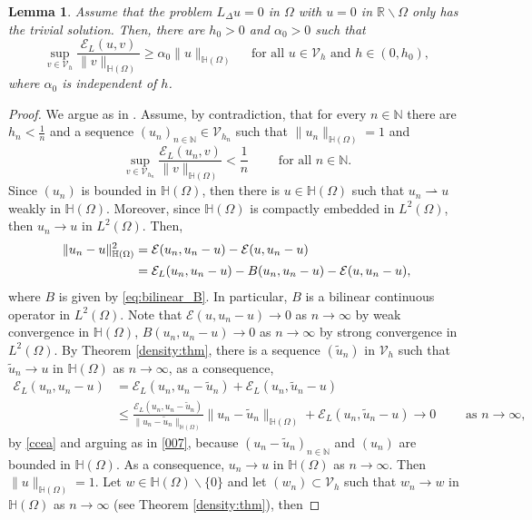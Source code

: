 \documentclass[11 pt]{article}
\newtheorem{lemma}[theorem]{Lemma}
\numberwithin{equation}{section}
\def\N{\mathbb{N}}
\def\R{\mathbb{R}}
\def\cE{\mathcal{E}}
\begin{document}
\begin{lemma}
Assume that the problem $L_\Delta u=0$ in $\Omega$ with $u=0$ in $\R\backslash  \Omega$ only has the trivial solution.  Then, there are $h_0>0$ and $\alpha_0>0$ such that
\begin{equation*}
    \sup_{v\in \mathcal V_h}\frac{\cE_{L}(u,v)}{\|v\|_{\mathbb H(\Omega)}}\geq \alpha_0\|u\|_{\mathbb H(\Omega)} \quad\text{ for all } u\in\mathcal V_h \text{ and }h\in(0,h_0),
\end{equation*}
where $\alpha_0$ is independent of $h$.
\end{lemma}
\begin{proof}
We argue as in \cite[Theorem 4.2.1]{dem20}. Assume, by contradiction, that for every $n\in\N$ there are $h_n<\frac{1}{n}$ and a sequence $(u_n)_{n\in\N}\in \mathcal V_{h_n}$ such that $\|u_n\|_{\mathbb H(\Omega)}=1$ and
\begin{equation}\label{ccea}
    \sup_{v\in \mathcal V_{h_n}}\frac{\cE_{L}(u_n,v)}{\|v\|_{\mathbb H(\Omega)}}<\frac{1}{n}\qquad \text{ for all }n\in\N.
\end{equation}
Since $(u_n)$ is bounded in $\mathbb H(\Omega)$, then there is $u\in \mathbb H(\Omega)$ such that $u_n \rightharpoonup u$ weakly in $\mathbb H(\Omega)$. Moreover, since $\mathbb H(\Omega)$ is compactly embedded in $L^2(\Omega)$, then $u_n\to u$ in $L^2(\Omega)$.  Then,
\begin{align}
    \|u_n-u\|^2_{\mathbb H(\Omega)}
    &=\cE(u_n,u_n-u)-\cE(u,u_n-u)\notag\\
    &=\cE_L(u_n,u_n-u)-B(u_n,u_n-u)-\cE(u,u_n-u),\label{007}
\end{align}
where $B$ is given by \eqref{eq:bilinear_B}.  In particular, $B$ is a bilinear continuous operator in $L^2(\Omega)$.  Note that $\cE(u,u_n-u)\to 0$ as $n\to \infty$ by weak convergence in $\mathbb H(\Omega)$, $B(u_n,u_n-u)\to 0$ as $n\to \infty$ by strong convergence in $L^2(\Omega)$. By Theorem \ref{density:thm}, there is a sequence $(\widetilde u_n)$ in $\mathcal V_h$ such that $\widetilde u_n\to u$ in $\mathbb H(\Omega)$ as $n\to \infty$, as a consequence,
\begin{align*}
    \cE_L(u_n,u_n-u)
    &=\cE_L(u_n,u_n-\widetilde u_n)+\cE_L(u_n,\widetilde u_n-u)\\
    &\leq \frac{\cE_L(u_n,u_n-\widetilde u_n)}{\|u_n-\widetilde u_n\|_{\mathbb H(\Omega)}}\|u_n-\widetilde u_n\|_{\mathbb H(\Omega)}+\cE_L(u_n,\widetilde u_n-u) \to 0\qquad \text{ as }n\to \infty,
\end{align*}
by \eqref{ccea} and arguing as in \eqref{007}, because $(u_n-\widetilde u_n)_{n\in\N}$ and $(u_n)$ are bounded in $\mathbb H(\Omega)$.  As a consequence, $u_n\to u$ in $\mathbb H(\Omega)$ as $n\to\infty$. Then $\|u\|_{\mathbb H(\Omega)}=1$. Let $w\in \mathbb H(\Omega)\backslash \{0\}$ and let $(w_n)\subset \mathcal V_h$ such that $w_n\to w$ in $\mathbb H(\Omega)$ as $n\to \infty$ (see Theorem \ref{density:thm}), then

\end{proof}
\end{document}
